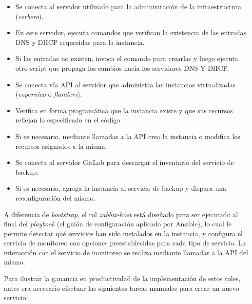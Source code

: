 \begin{itemize}
\item Se conecta al servidor utilizado para la administración de la infraestructura (\textit{cerbero}).
\item En este servidor, ejecuta comandos que verifican la existencia de las entradas DNS y DHCP requeridas para la instancia.
\item Si las entradas no existen, invoca el comando para crearlas y luego ejecuta otro script que propaga los cambios hacia los servidores DNS Y DHCP.
\item Se conecta vía API al servidor que administra las instancias virtualizadas (\textit{copernico} o \textit{flanders}).
\item Verifica en forma programática que la instancia existe y que sus recursos reflejan lo especificado en el código.
\item Si es necesario, mediante llamadas a la API crea la instancia o modifica los recursos asignados a la misma.
\item Se conecta al servidor GitLab para descargar el inventario del servicio de backup.
\item Si es necesario, agrega la instancia al servicio de backup y dispara una reconfiguración del mismo.
\end{itemize}
A diferencia de \textit{bootstrap}, el rol \textit{zabbix-host} está diseñado para ser ejecutado al final del \textit{playbook} (el guión de configuración aplicado por Ansible), lo cual le permite detectar qué servicios han sido instalados en la instancia, y configura el servicio de monitoreo con opciones preestablecidas para cada tipo de servicio. La interacción con el servicio de monitoreo se realiza mediante llamadas a la API del mismo.

Para ilustrar la ganancia en productividad de la implementación de estos roles, antes era necesario efectuar las siguientes tareas manuales para crear un nuevo servicio:

